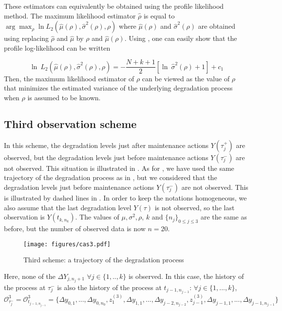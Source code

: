 These estimators can equivalently be obtained using the profile likelihood method. The maximum likelihood estimator $\hat\rho$ is equal to $\arg\max_{\rho} \ln L_2(\hat\mu(\rho),\hat\sigma^2(\rho),\rho)$ where $\hat\mu(\rho)$ and $\hat\sigma^2(\rho)$ are obtained using   replacing $\hat\rho$ and $\hat\mu$ by $\rho$ and $\hat\mu(\rho)$.
Using , one can easily show that the profile log-likelihood can be written 

$$ \ln\ L_2(\hat\mu(\rho),\hat\sigma^2(\rho),\rho)= - \frac{N+k+1}{2} \left[\ln\ \hat\sigma^2 (\rho) +1 \right] +c_1$$
Then, the maximum likelihood estimator of $\rho$ can be viewed as the value of $\rho$ that minimizes the estimated variance of the underlying degradation process when $\rho$ is assumed to be known.

\subsection{Third observation scheme}
\label{3case}

In this scheme, the degradation levels just after maintenance actions $Y(\tau_j^+)$ are observed, but the degradation levels just before maintenance actions $Y(\tau_j^-)$ are not observed. This situation is illustrated in . As for , we have used the same trajectory of the degradation process as in , but we considered that the degradation levels just before maintenance actions $Y(\tau_j^-)$ are not observed. This is illustrated by dashed lines in . In order to keep the notations homogeneous, we also assume that the last degradation level $Y(\tau)$ is not observed, so the last observation is $Y(t_{k,n_k})$.
The values of $\mu, \sigma^2,\rho$, $k$ and $\{n_j\}_{0 \leq j \leq 3}$ are the same as before, but the number of observed data is now $n=20$.


\begin{figure}[htbp]
\centering
\texttt{[image: figures/cas3.pdf]} 
\caption{Third scheme: a trajectory of the degradation process}
\label{fig:cas3}
\end{figure}

Here, none of the $\Delta Y_{j,n_j+1}$ $\forall j \in \{1,..,k\}$ is observed. In this case, the history of the process at $\tau_j^-$ is also the history of the process at $t_{j-1,n_{j-1}}$:
$\forall j \in \{1,...,k\}$,\\
$\mathcal{O}_{\tau_j^-}^3=\mathcal{O}_{t_{j-1,n_{j-1}}}^3=\{\Delta y_{0,1},...,\Delta y_{0,n_0},z_{1}^{(3)},\Delta y_{1,1},...,\Delta y_{j-2,n_{j-2}},z^{(3)}_{j-1},\Delta y_{j-1,1},...,\Delta y_{j-1,n_{j-1}}\}$

